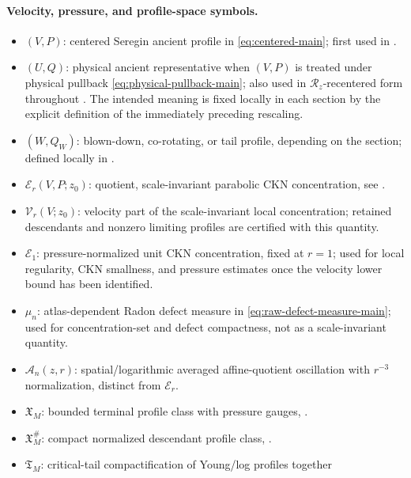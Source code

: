 \documentclass[11pt]{amsart}
\numberwithin{equation}{section}
\theoremstyle{plain}
\theoremstyle{definition}
\theoremstyle{remark}
\newcommand{\calR}{\mathcal R}
\newcommand{\calE}{\mathcal E}
\newcommand{\Vel}{\mathcal V}
\newcommand{\Tcrit}{\mathfrak T_M}
\begin{document}
\paragraph{Velocity, pressure, and profile-space symbols.}
\begin{itemize}[leftmargin=1.6em]
   \item \((V,P)\): centered Seregin ancient profile in \eqref{eq:centered-main};
      first used in .
   \item \((U,Q)\): physical ancient representative when \((V,P)\) is treated
      under physical pullback \eqref{eq:physical-pullback-main}; also used in
      \(\calR_z\)-recentered form throughout
      .  The intended
      meaning is fixed locally in each section by the explicit definition of
      the immediately preceding rescaling.
   \item \((W,Q_W)\): blown-down, co-rotating, or tail profile, depending on
      the section; defined locally in
      .
   \item \(\calE_r(V,P;z_0)\): quotient, scale-invariant parabolic CKN
      concentration, see .
   \item \(\Vel_r(V;z_0)\): velocity part of the scale-invariant local
      concentration; retained descendants and nonzero limiting profiles are
      certified with this quantity.
   \item \(\calE_1\): pressure-normalized unit CKN concentration, fixed at
      \(r=1\); used for local regularity, CKN smallness, and pressure estimates
      once the velocity lower bound has been identified.
   \item \(\mu_n\): atlas-dependent Radon defect measure in
      \eqref{eq:raw-defect-measure-main}; used for concentration-set and defect
      compactness, not as a scale-invariant quantity.
   \item \(\mathcal A_n(z,r)\): spatial/logarithmic averaged affine-quotient
      oscillation with \(r^{-3}\) normalization, distinct from \(\calE_r\).
   \item \(\mathfrak X_M\): bounded terminal profile class with pressure gauges,
      .
   \item \(\mathfrak X_M^\#\): compact normalized descendant profile class,
      .
   \item \(\Tcrit\): critical-tail compactification of Young/log profiles together

\end{itemize}
\end{document}
